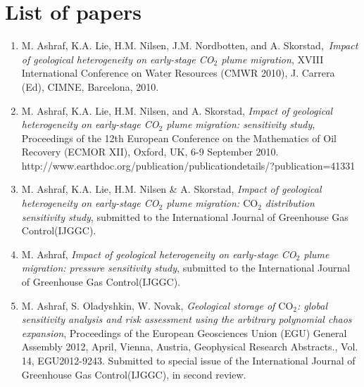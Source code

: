 \chapter{List of papers}

\begin{enumerate}

\item {M. Ashraf, K.A. Lie, H.M. Nilsen, J.M. Nordbotten, and A.
Skorstad},~\textit{Impact of geological heterogeneity on early-stage CO$_2$ plume
migration}, XVIII International Conference
on Water Resources (CMWR 2010), J. Carrera (Ed), CIMNE, Barcelona, 2010.

\item {M. Ashraf, K.A. Lie, H.M. Nilsen, and A. Skorstad}, \textit{Impact of
geological heterogeneity on early-stage CO$_2$ plume migration: sensitivity
study}, Proceedings of the 12th European Conference on the Mathematics of
Oil Recovery (ECMOR XII), Oxford, UK, 6-9 September 2010.
\\ http://www.earthdoc.org/publication/publicationdetails/?publication=41331

\item {M. Ashraf, K.A. Lie, H.M. Nilsen \& A. Skorstad}, \textit{Impact of
geological heterogeneity on early-stage {CO}$_2$ plume migration: $\mbox{CO}_2$
distribution sensitivity study}, submitted to the International Journal of
Greenhouse Gas Control(IJGGC). 

\item {M. Ashraf}, \textit{Impact of geological heterogeneity on early-stage
{CO}$_2$ plume migration: pressure sensitivity study}, submitted to the
International Journal of Greenhouse Gas Control(IJGGC).  

\item {M. Ashraf, S. Oladyshkin, W. Novak}, \textit{Geological storage of
$\mbox{CO}_{2}$: global sensitivity analysis and risk assessment using
the arbitrary polynomial chaos expansion}, Proceedings of the European
Geosciences Union (EGU) General Assembly 2012, April, Vienna, Austria,
Geophysical Research Abstracts., Vol. 14, EGU2012-9243. Submitted to special
issue of the International Journal of Greenhouse Gas Control(IJGGC), in second
review.

\end{enumerate}
